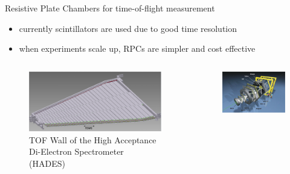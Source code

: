 \documentclass{beamer}
\begin{document}
\begin{frame}{Resistive Plate Chambers for time-of-flight measurement}
\begin{itemize}
  \item currently scintillators are used due to good time resolution
  \item when experiments scale up, RPCs are simpler and cost effective
\end{itemize}

\begin{columns}
\begin{column}{.6\textwidth}
\begin{figure}
\includegraphics[width=\textwidth]{plots/HADES_RPC.png}
    \caption{TOF Wall of the High Acceptance Di-Electron Spectrometer (HADES)}
\end{figure}
\end{column}
\begin{column}{.4\textwidth}
\begin{figure}
\includegraphics[width=\textwidth]{plots/Hades_scheme.jpg}
\end{figure}
\end{column}
\end{columns}
\end{frame}
\end{document}
